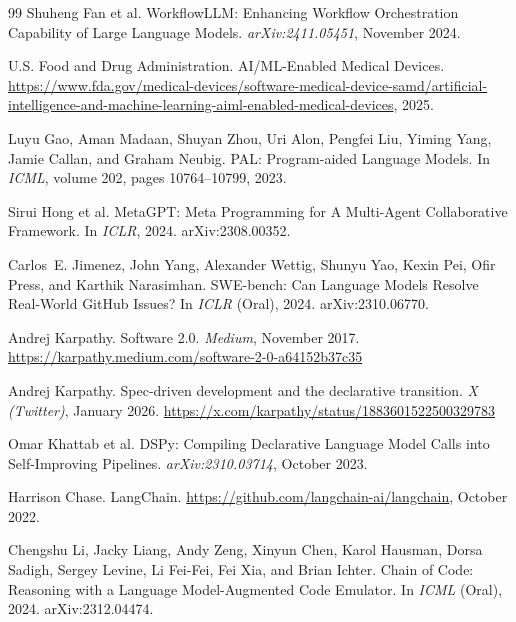 \documentclass[11pt]{article}
\begin{document}
\begin{thebibliography}{99}
Shuheng Fan et al.
\newblock WorkflowLLM: Enhancing Workflow Orchestration Capability of Large Language Models.
\newblock \emph{arXiv:2411.05451}, November 2024.

U.S. Food and Drug Administration.
\newblock AI/ML-Enabled Medical Devices.
\newblock \url{https://www.fda.gov/medical-devices/software-medical-device-samd/artificial-intelligence-and-machine-learning-aiml-enabled-medical-devices}, 2025.

Luyu Gao, Aman Madaan, Shuyan Zhou, Uri Alon, Pengfei Liu, Yiming Yang, Jamie Callan, and Graham Neubig.
\newblock PAL: Program-aided Language Models.
\newblock In \emph{ICML}, volume 202, pages 10764--10799, 2023.

Sirui Hong et al.
\newblock MetaGPT: Meta Programming for A Multi-Agent Collaborative Framework.
\newblock In \emph{ICLR}, 2024.
\newblock arXiv:2308.00352.

Carlos~E. Jimenez, John Yang, Alexander Wettig, Shunyu Yao, Kexin Pei, Ofir Press, and Karthik Narasimhan.
\newblock SWE-bench: Can Language Models Resolve Real-World GitHub Issues?
\newblock In \emph{ICLR} (Oral), 2024.
\newblock arXiv:2310.06770.

Andrej Karpathy.
\newblock Software 2.0.
\newblock \emph{Medium}, November 2017.
\newblock \url{https://karpathy.medium.com/software-2-0-a64152b37c35}

Andrej Karpathy.
\newblock Spec-driven development and the declarative transition.
\newblock \emph{X (Twitter)}, January 2026.
\newblock \url{https://x.com/karpathy/status/1883601522500329783}

Omar Khattab et al.
\newblock DSPy: Compiling Declarative Language Model Calls into Self-Improving Pipelines.
\newblock \emph{arXiv:2310.03714}, October 2023.

Harrison Chase.
\newblock LangChain.
\newblock \url{https://github.com/langchain-ai/langchain}, October 2022.

Chengshu Li, Jacky Liang, Andy Zeng, Xinyun Chen, Karol Hausman, Dorsa Sadigh, Sergey Levine, Li Fei-Fei, Fei Xia, and Brian Ichter.
\newblock Chain of Code: Reasoning with a Language Model-Augmented Code Emulator.
\newblock In \emph{ICML} (Oral), 2024.
\newblock arXiv:2312.04474.


\end{thebibliography}
\end{document}
